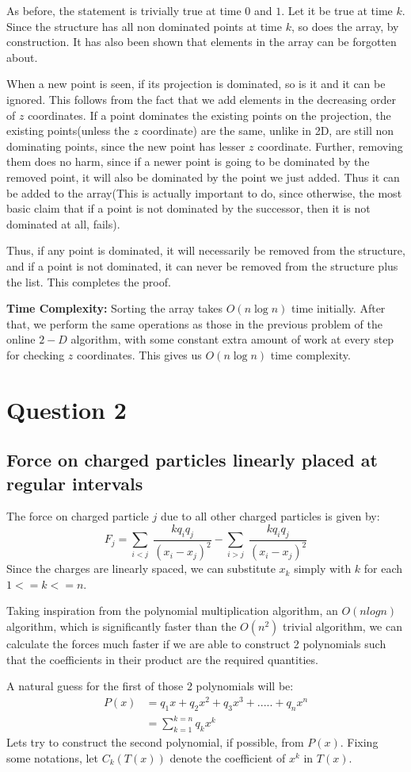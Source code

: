 \documentclass{article}
\begin{document}
\par
As before, the statement is trivially true at time $0$ and $1$.
Let it be true at time $k$.
Since the structure has all non dominated points at time $k$, so does the array, by construction.
It has also been shown that elements in the array can be forgotten about.
\par
When a new point is seen, if its projection is dominated, so is it and it can be ignored.
This follows from the fact that we add elements in the decreasing order of $z$ coordinates.
If a point dominates the existing points on the projection, the existing points(unless the $z$ coordinate) are the same, unlike in 2D, are still non dominating points, since the new point has lesser $z$ coordinate.
Further, removing them does no harm, since if a newer point is going to be dominated by the removed point, it will also be dominated by the point we just added.
Thus it can be added to the array(This is actually important to do, since otherwise, the most basic claim that if a point is not dominated by the successor, then it is not dominated at all, fails).
\par
Thus, if any point is dominated, it will necessarily be removed from the structure, and if a point is not dominated, it can never be removed from the structure plus the list.
This completes the proof.

\par
\textbf{Time Complexity:} Sorting the array takes $O(n \log{n})$ time initially.
After that, we perform the same operations as those in the previous problem of the online $2-D$ algorithm, with some constant extra amount of work at every step for checking $z$ coordinates.
This gives us $O(n \log{n})$ time complexity.
\pagebreak
\section{Question 2}
\subsection{Force on charged particles linearly placed at regular intervals}
The force on charged particle $j$ due to all other charged particles is given by:
$$ F_j= \sum_{i < j}\; \frac{kq_iq_j}{(x_i - x_j)^2} - \sum_{i > j}\; \frac{kq_iq_j}{(x_i - x_j)^2} $$
Since the charges are linearly spaced, we can substitute $x_k$ simply with $k$ for each $1<=k <= n$.
\par
Taking inspiration from the polynomial multiplication algorithm, an $O(nlogn)$ algorithm, which is significantly faster than the $O(n^2)$ trivial algorithm, we can calculate the forces much faster if we are able to construct 2 polynomials such that the coefficients in their product are the required quantities.
\par
A natural guess for the first of those 2 polynomials will be:
\begin{align*}
	P(x) 	&= q_1x + q_2x^2 + q_3x^3 + ..... + q_nx^n \\
			&= \sum_{k=1}^{k=n}q_kx^k
\end{align*}
Lets try to construct the second polynomial, if possible, from $P(x)$. Fixing some notations, let $C_k(T(x))$ denote the coefficient of $x^k$ in $T(x)$.
\end{document}
